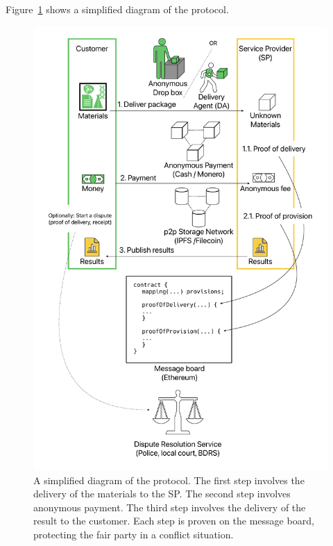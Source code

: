 \documentclass[pdftex,twocolumn,epjc3]{svjour3}
\begin{document}
Figure~\ref{fig:protocol-overview} shows a simplified diagram of the protocol.

\begin{figure}[h!]
\includegraphics[width=\linewidth]{protocol-overview.pdf}
\centering
\caption{A simplified diagram of the protocol. The first step involves the delivery of the materials to the SP. The second step involves anonymous payment. The third step involves the delivery of the result to the customer. Each step is proven on the message board, protecting the fair party in a conflict situation.}

\label{fig:protocol-overview}
\end{figure}
\end{document}
